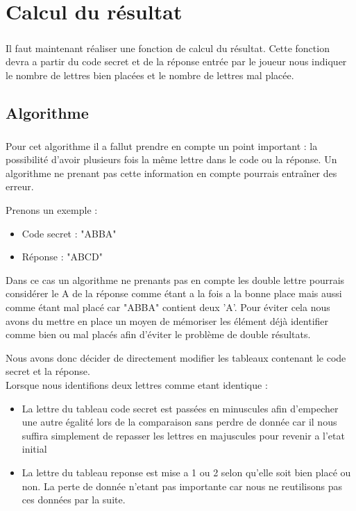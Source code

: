 \chapter{Calcul du résultat}
\paragraph{}
	Il faut maintenant réaliser une fonction de calcul du résultat.
Cette fonction devra a partir du code secret et de la réponse entrée par le joueur nous indiquer le nombre de lettres bien placées et le nombre de lettres mal placée.

\section{Algorithme}
\paragraph{}
	Pour cet algorithme il a fallut prendre en compte un point important : la possibilité d'avoir plusieurs fois la même lettre dans le code ou la réponse.
Un algorithme ne prenant pas cette information en compte pourrais entraîner des erreur.  

Prenons un exemple : 
  \begin{itemize}
    \item Code secret : "ABBA"
    \item Réponse : "ABCD"
  \end{itemize}
Dans ce cas un algorithme ne prenants pas en compte les double lettre pourrais considérer le A de la réponse comme étant a la fois a la bonne place mais aussi comme étant mal placé car "ABBA" contient deux 'A'.
Pour éviter cela nous avons du mettre en place un moyen de mémoriser les élément déjà identifier comme bien ou mal placés afin d'éviter le problème de double résultats.

	Nous avons donc décider de directement modifier les tableaux contenant le code secret et la réponse.\\
    
    Lorsque nous identifions deux lettres comme etant identique :
    \begin{itemize}
    \item La lettre du tableau code secret est passées en minuscules afin d'empecher une autre égalité lors de la comparaison sans perdre de donnée car il nous suffira simplement de repasser les lettres en majuscules pour revenir a l'etat initial
    \item La lettre du tableau reponse est mise a 1 ou 2 selon qu'elle soit bien placé ou non. La perte de donnée n'etant pas importante car nous ne reutilisons pas ces données par la suite. 
    \end{itemize}

